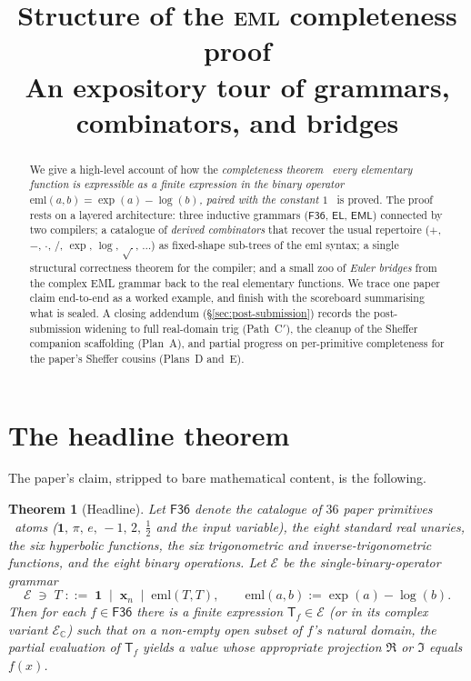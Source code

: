 \documentclass[11pt]{article}
\title{Structure of the \textsc{eml} completeness proof\\[2pt]
       \large An expository tour of grammars, combinators, and bridges}
\author{}
\date{}
\newcommand{\F}{\mathsf{F36}}
\newcommand{\EL}{\mathsf{EL}}
\newcommand{\EML}{\mathsf{EML}}
\newcommand{\Eset}{\mathcal{E}}
\newcommand{\EsetC}{\mathcal{E}_{\mathbb{C}}}
\theoremstyle{plain}
\newtheorem{theorem}{Theorem}
\theoremstyle{definition}
\begin{document}
\maketitle

\begin{abstract}
We give a high-level account of how the \emph{completeness theorem}
\textemdash\ \emph{every elementary function is expressible as a finite
expression in the binary operator $\mathrm{eml}(a, b) = \exp(a) -
\log(b)$, paired with the constant $1$} \textemdash\ is proved.
The proof rests on a layered architecture: three inductive grammars
($\F$, $\EL$, $\EML$) connected by two compilers; a catalogue of
\emph{derived combinators} that recover the usual repertoire
($+$, $-$, $\cdot$, $/$, $\exp$, $\log$, $\sqrt{\,}$, $\ldots$) as
fixed-shape sub-trees of the $\mathrm{eml}$ syntax; a single structural
correctness theorem for the compiler; and a small zoo of
\emph{Euler bridges} from the complex EML grammar back to the real
elementary functions. We trace one paper claim end-to-end as a worked
example, and finish with the scoreboard summarising what is sealed.
A closing addendum (\S\ref{sec:post-submission}) records the post-
submission widening to full real-domain trig (Path~C$'$), the cleanup
of the Sheffer companion scaffolding (Plan~A), and partial progress
on per-primitive completeness for the paper's Sheffer cousins
(Plans~D and~E).
\end{abstract}

\tableofcontents

\section{The headline theorem}

The paper's claim, stripped to bare mathematical content, is the
following.

\begin{theorem}[Headline]
\label{thm:headline}
Let $\F$ denote the catalogue of $36$ paper primitives \textemdash\ atoms
($\mathbf{1},\,\pi,\,e,\,-1,\,2,\,\tfrac{1}{2}$ and the input variable),
the eight standard real unaries, the six hyperbolic functions, the
six trigonometric and inverse-trigonometric functions, and the eight
binary operations. Let $\Eset$ be the single-binary-operator grammar
\[
  \Eset \;\ni\; T \;::=\; \mathbf{1} \;\;\big|\;\; \mathbf{x}_n
       \;\;\big|\;\; \mathrm{eml}(T, T),
  \qquad \mathrm{eml}(a, b) := \exp(a) - \log(b).
\]
Then for each $f \in \F$ there is a finite expression $\mathsf{T}_{f}
\in \Eset$ \textup{(}or in its complex variant $\EsetC$\textup{)} such
that on a non-empty open subset of $f$'s natural domain, the
partial evaluation of $\mathsf{T}_f$ yields a value whose appropriate
projection $\Re$ or $\Im$ equals $f(x)$.
\end{theorem}
\end{document}
